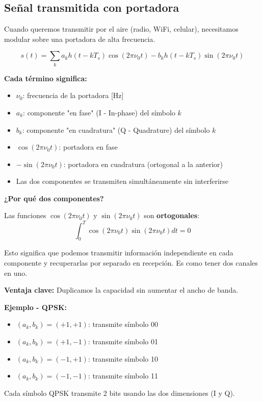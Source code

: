 \documentclass[11pt,a4paper]{article}
\begin{document}
\subsection{Señal transmitida con portadora}

Cuando queremos transmitir por el aire (radio, WiFi, celular), necesitamos modular sobre una portadora de alta frecuencia.

\begin{tcolorbox}[colback=verdeclaro!20,colframe=azuloscuro,title=\textbf{Señal con portadora (forma real)}]
$$\boxed{s(t) = \sum_{k} a_k h(t-kT_s)\cos(2\pi\nu_0 t) - b_k h(t-kT_s)\sin(2\pi\nu_0 t)}$$

\textbf{Cada término significa:}
\begin{itemize}
\item $\nu_0$: frecuencia de la portadora [Hz]
\item $a_k$: componente "en fase" (I - In-phase) del símbolo $k$
\item $b_k$: componente "en cuadratura" (Q - Quadrature) del símbolo $k$
\item $\cos(2\pi\nu_0 t)$: portadora en fase
\item $-\sin(2\pi\nu_0 t)$: portadora en cuadratura (ortogonal a la anterior)
\item Las dos componentes se transmiten simultáneamente sin interferirse
\end{itemize}

\textbf{¿Por qué dos componentes?}

Las funciones $\cos(2\pi\nu_0 t)$ y $\sin(2\pi\nu_0 t)$ son \textbf{ortogonales}:
$$\int_0^{T} \cos(2\pi\nu_0 t)\sin(2\pi\nu_0 t)dt = 0$$

Esto significa que podemos transmitir información independiente en cada componente y recuperarlas por separado en recepción. Es como tener dos canales en uno.

\textbf{Ventaja clave:} Duplicamos la capacidad sin aumentar el ancho de banda.

\textbf{Ejemplo - QPSK:}
\begin{itemize}
\item $(a_k, b_k) = (+1, +1)$: transmite símbolo 00
\item $(a_k, b_k) = (+1, -1)$: transmite símbolo 01
\item $(a_k, b_k) = (-1, +1)$: transmite símbolo 10
\item $(a_k, b_k) = (-1, -1)$: transmite símbolo 11
\end{itemize}

Cada símbolo QPSK transmite 2 bits usando las dos dimensiones (I y Q).
\end{tcolorbox}
\end{document}
